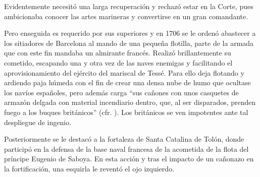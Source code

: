 Evidentemente necesitó una larga recuperación y rechazó estar en la
Corte, pues ambicionaba conocer las artes marineras y convertirse en
un gran comandante.

Pero enseguida es requerido por sus superiores y en 1706 se le ordenó
abastecer a los sitiadores de Barcelona al mando de una pequeña
flotilla, parte de la armada  que con este fin mandaba
un almirante francés. Realizó brillantemente su cometido, escapando
una y otra vez de las naves enemigas y facilitando el
aprovisionamiento del ejército del mariscal de Tessé. Para ello deja
flotando y ardiendo paja húmeda con el fin de crear una densa nube de
humo que ocultase los navíos españoles, pero además carga ``sus
cañones con unos casquetes de armazón delgada con material incendiario
dentro, que, al ser disparados, prenden fuego a los buques
británicos'' (cfr. \cite{garciarivas}). Los británicos se ven
impotentes ante tal despliegue de ingenio.

Posteriormente se le destacó a la fortaleza de Santa Catalina de
Tolón, donde participó en la defensa de la base naval francesa de la
acometida de la flota del príncipe Eugenio de Saboya. En esta acción y
tras el impacto de un cañonazo en la fortificación, una esquirla le
reventó el ojo izquierdo.

